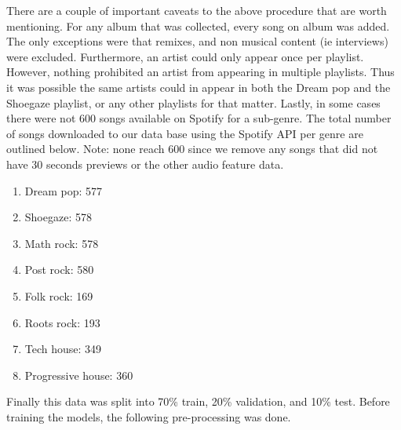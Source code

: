 \documentclass[letterpaper, 12 pt, conference]{ieeeconf}  %
\begin{document}
There are a couple of important caveats to the above procedure that are worth mentioning. For any album that was collected, every song on album was added. The only exceptions were that remixes, and non musical content (ie interviews) were excluded. Furthermore, an artist could only appear once per playlist. However, nothing prohibited an artist from appearing in multiple playlists. Thus it was possible the same artists could in appear in both the Dream pop and the Shoegaze playlist, or any other playlists for that matter. Lastly, in some cases there were not 600 songs available on Spotify for a sub-genre. The total number of songs downloaded to our data base using the Spotify API per genre are outlined below. Note: none reach 600 since we remove any songs that did not have 30 seconds previews or the other audio feature data.

\begin{enumerate}
    \item Dream pop: 577
    \item Shoegaze: 578
    \item Math rock:   578
    \item Post rock: 580
    \item Folk rock: 169       
    \item  Roots rock: 193
    \item Tech house: 349
    \item Progressive house: 360
\end{enumerate}

Finally this data was split into 70\% train, 20\% validation, and 10\% test. Before training the models, the following pre-processing was done.


 


\end{document}
